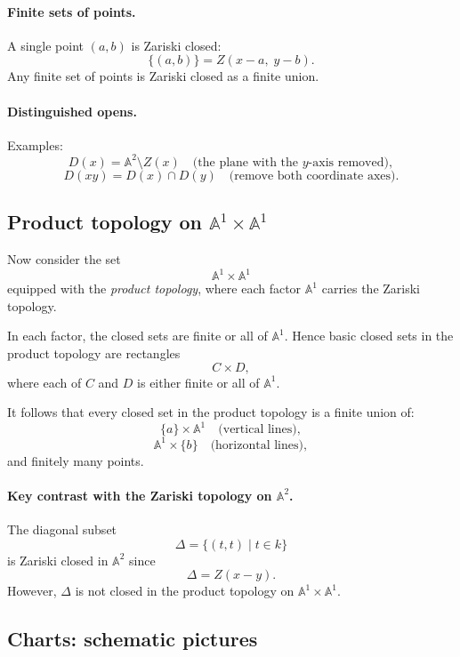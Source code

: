 \documentclass[12pt,a4paper]{article}
\theoremstyle{plain}
\theoremstyle{definition}      %
\begin{document}
\paragraph{Finite sets of points.}
A single point $(a,b)$ is Zariski closed:
\[
\{(a,b)\}
=
Z(x-a,\;y-b).
\]
Any finite set of points is Zariski closed as a finite union.

\paragraph{Distinguished opens.}
Examples:
\[
D(x)
=
\mathbb A^2\setminus Z(x)
\quad
\text{(the plane with the $y$-axis removed)},
\]
\[
D(xy)
=
D(x)\cap D(y)
\quad
\text{(remove both coordinate axes)}.
\]

\subsection*{Product topology on $\mathbb A^1\times \mathbb A^1$}

Now consider the set
\[
\mathbb A^1\times \mathbb A^1
\]
equipped with the \emph{product topology}, where each factor $\mathbb A^1$ carries the Zariski topology.

In each factor, the closed sets are finite or all of $\mathbb A^1$.
Hence basic closed sets in the product topology are rectangles
\[
C\times D,
\]
where each of $C$ and $D$ is either finite or all of $\mathbb A^1$.

It follows that every closed set in the product topology is a finite union of:
\[
\{a\}\times \mathbb A^1
\quad
\text{(vertical lines)},
\]
\[
\mathbb A^1\times \{b\}
\quad
\text{(horizontal lines)},
\]
and finitely many points.

\paragraph{Key contrast with the Zariski topology on $\mathbb A^2$.}
The diagonal subset
\[
\Delta
=
\{(t,t)\mid t\in k\}
\]
is Zariski closed in $\mathbb A^2$ since
\[
\Delta
=
Z(x-y).
\]
However, $\Delta$ is not closed in the product topology on $\mathbb A^1\times \mathbb A^1$.

\subsection*{Charts: schematic pictures}
\end{document}
